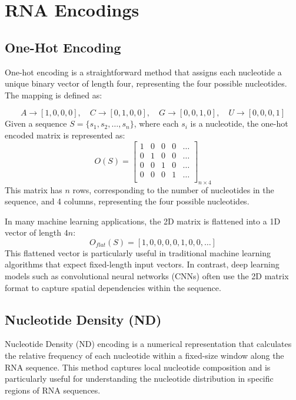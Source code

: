 \section{RNA Encodings}\label{sec:encodings}

  \subsection{One-Hot Encoding}\label{subsec:binary}
    One-hot encoding is a straightforward method that assigns each nucleotide a unique binary vector of length four, representing the four possible nucleotides.
    The mapping is defined as:

    \[
      A \rightarrow [1, 0, 0, 0], \quad
      C \rightarrow [0, 1, 0, 0], \quad
      G \rightarrow [0, 0, 1, 0], \quad
      U \rightarrow [0, 0, 0, 1]
    \]
    Given a sequence $S = \{s_1, s_2, \dots, s_n\}$, where each $s_i$ is a nucleotide, the one-hot encoded matrix is represented as:
    \[
      O(S) = \begin{bmatrix}
               1 & 0 & 0 & 0 & \dots \\
               0 & 1 & 0 & 0 & \dots \\
               0 & 0 & 1 & 0 & \dots \\
               0 & 0 & 0 & 1 & \dots \\
      \end{bmatrix}_{n \times 4}
    \]
    This matrix has $n$ rows, corresponding to the number of nucleotides in the sequence, and 4 columns, representing the four possible nucleotides.

    In many machine learning applications, the 2D matrix is flattened into a 1D vector of length $4n$:
    \[
      O_{flat}(S) = [1, 0, 0, 0, 0, 1, 0, 0, \dots]
    \]
    This flattened vector is particularly useful in traditional machine learning algorithms that expect fixed-length input vectors.
    In contrast, deep learning models such as convolutional neural networks (CNNs) often use the 2D matrix format to capture spatial dependencies within the sequence.

  \subsection{Nucleotide Density (ND)}\label{subsec:nd}
    Nucleotide Density (ND) encoding is a numerical representation that calculates the relative frequency of each nucleotide within a fixed-size window along the RNA sequence.
    This method captures local nucleotide composition and is particularly useful for understanding the nucleotide distribution in specific regions of RNA sequences.


